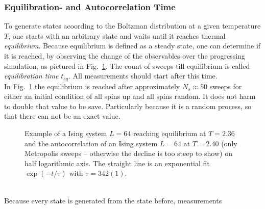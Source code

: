     \subsubsection{Equilibration- and Autocorrelation Time}
    \label{sssec:eqtime}
        To generate states acoording to the Boltzman distribution at a
        given temperature \(T\), one starts with an arbitrary state
        and waits until it reaches thermal \emph{equilibrium}. Because
        equilibrium is defined as a steady state, one can determine if it
        is reached, by observing the change of the observables over the
        progressing simulation, as pictured in Fig.\ \ref{fig:equiandauto}.
        The count of sweeps till
        equilibrium is called \emph{equilibration time} \(t_{eq}\).
        All measurements should start after this time.\\
        In Fig.\ \ref{fig:equiandauto}
        the equilibrium is reached after approximately \(N_{s} \approx 50\) sweeps for
        either an initial condition of all spins up and all spins random. It
        does not harm to double that value to be save. Particularly because
        it is a random process, so that there can not be an exact value.
        \begin{figure}[htbp]
            \centering
            \caption[Examples for Equilibration and Autocorrelation]
            {
                 Example of a Ising system
                    \(L=64\) reaching equilibrium at \(T=2.36\) and
                 the autocorrelation of an
                    Ising system \(L=64\) at \(T=2.40\) (only Metropolis
                    sweeps -- otherwise the decline is too steep to show)
                    on half logarithmic axis.
                    The straight line is an exponential fit \(\exp(-t/\tau)\)
                    with \(\tau = 342(1)\).
            }
            \label{fig:equiandauto}
        \end{figure}\\
        Because every state is generated from the state before, measurements
